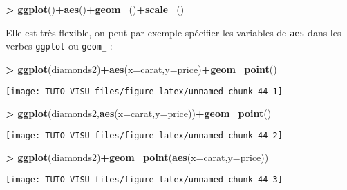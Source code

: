 \documentclass[]{article}
\newenvironment{Shaded}{\begin{snugshade}}{\end{snugshade}}
\newcommand{\DataTypeTok}[1]{\textcolor[rgb]{0.13,0.29,0.53}{#1}}
\newcommand{\KeywordTok}[1]{\textcolor[rgb]{0.13,0.29,0.53}{\textbf{#1}}}
\newcommand{\NormalTok}[1]{#1}
\newcommand{\OperatorTok}[1]{\textcolor[rgb]{0.81,0.36,0.00}{\textbf{#1}}}
\newcommand{\StringTok}[1]{\textcolor[rgb]{0.31,0.60,0.02}{#1}}
\theoremstyle{definition}
\theoremstyle{definition}
\theoremstyle{definition}
\theoremstyle{remark}
\begin{document}
\begin{Shaded}
\begin{Highlighting}[]
\OperatorTok{>}\StringTok{ }\KeywordTok{ggplot}\NormalTok{()}\OperatorTok{+}\KeywordTok{aes}\NormalTok{()}\OperatorTok{+}\KeywordTok{geom_}\NormalTok{()}\OperatorTok{+}\KeywordTok{scale_}\NormalTok{()}
\end{Highlighting}
\end{Shaded}

Elle est très flexible, on peut par exemple spécifier les variables de \texttt{aes} dans les verbes \texttt{ggplot} ou \texttt{geom\_} :

\begin{Shaded}
\begin{Highlighting}[]
\OperatorTok{>}\StringTok{ }\KeywordTok{ggplot}\NormalTok{(diamonds2)}\OperatorTok{+}\KeywordTok{aes}\NormalTok{(}\DataTypeTok{x=}\NormalTok{carat,}\DataTypeTok{y=}\NormalTok{price)}\OperatorTok{+}\KeywordTok{geom_point}\NormalTok{()}
\end{Highlighting}
\end{Shaded}

\begin{center}\texttt{[image: TUTO\_VISU\_files/figure-latex/unnamed-chunk-44-1]} \end{center}

\begin{Shaded}
\begin{Highlighting}[]
\OperatorTok{>}\StringTok{ }\KeywordTok{ggplot}\NormalTok{(diamonds2,}\KeywordTok{aes}\NormalTok{(}\DataTypeTok{x=}\NormalTok{carat,}\DataTypeTok{y=}\NormalTok{price))}\OperatorTok{+}\KeywordTok{geom_point}\NormalTok{()}
\end{Highlighting}
\end{Shaded}

\begin{center}\texttt{[image: TUTO\_VISU\_files/figure-latex/unnamed-chunk-44-2]} \end{center}

\begin{Shaded}
\begin{Highlighting}[]
\OperatorTok{>}\StringTok{ }\KeywordTok{ggplot}\NormalTok{(diamonds2)}\OperatorTok{+}\KeywordTok{geom_point}\NormalTok{(}\KeywordTok{aes}\NormalTok{(}\DataTypeTok{x=}\NormalTok{carat,}\DataTypeTok{y=}\NormalTok{price))}
\end{Highlighting}
\end{Shaded}

\begin{center}\texttt{[image: TUTO\_VISU\_files/figure-latex/unnamed-chunk-44-3]} \end{center}
\end{document}
